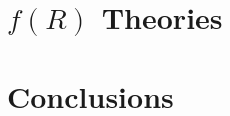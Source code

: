 \documentclass[a4paper,12pt,oneside,customfont,custombib,PageStyleII]{Settings/PhDThesisPSnPDF}
\begin{document}
\chapter{\texorpdfstring{$f(R)$}{f(R)} Theories}\label{chap:chapter2}




\chapter*{Conclusions}\label{chap:Conclusions}



\begin{appendices} %
\chapter{}\label{appendixA}

\end{appendices}

\backmatter

\begin{spacing}{0.9}

\cleardoublepage
\nocite{*}
\printbibliography[heading=bibintoc, title={References}]
\thispagestyle{empty}
\end{spacing}

\end{document}
